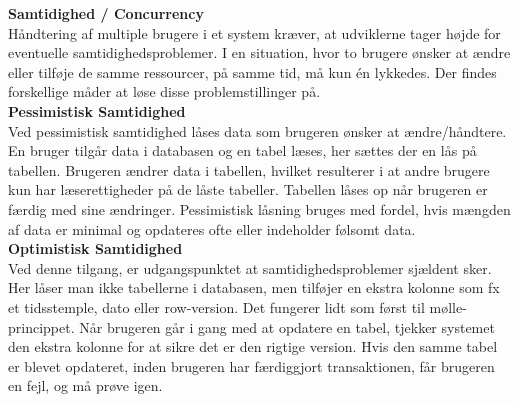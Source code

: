 \textbf{Samtidighed / Concurrency}\\
Håndtering af multiple brugere i et system kræver, 
at udviklerne tager højde for eventuelle samtidighedsproblemer. 
I en situation, hvor to brugere ønsker at ændre eller tilføje de samme ressourcer, 
på samme tid, må kun én lykkedes. 
Der findes forskellige måder at løse disse problemstillinger på.\\

\textbf{Pessimistisk Samtidighed}\\
Ved pessimistisk samtidighed låses data som brugeren ønsker at ændre/håndtere. 
En bruger tilgår data i databasen og en tabel læses, her sættes der en lås på 
tabellen. Brugeren ændrer data i tabellen, hvilket resulterer i at andre brugere 
kun har læserettigheder på de låste tabeller. Tabellen låses op når brugeren er 
færdig med sine ændringer. Pessimistisk låsning bruges med fordel, hvis mængden 
af data er minimal og opdateres ofte eller indeholder følsomt data.\\ 

\textbf{Optimistisk Samtidighed}\\
Ved denne tilgang, er udgangspunktet at samtidighedsproblemer sjældent sker. 
Her låser man ikke tabellerne i databasen, men tilføjer en ekstra kolonne som 
fx et tidsstemple, dato eller row-version. Det fungerer lidt som først til 
mølle-princippet. Når brugeren går i gang med at opdatere en tabel, tjekker 
systemet den ekstra kolonne for at sikre det er den rigtige version. 
Hvis den samme tabel er blevet opdateret, inden brugeren har færdiggjort 
transaktionen, får brugeren en fejl, og må prøve igen.\cite{MSOC}
